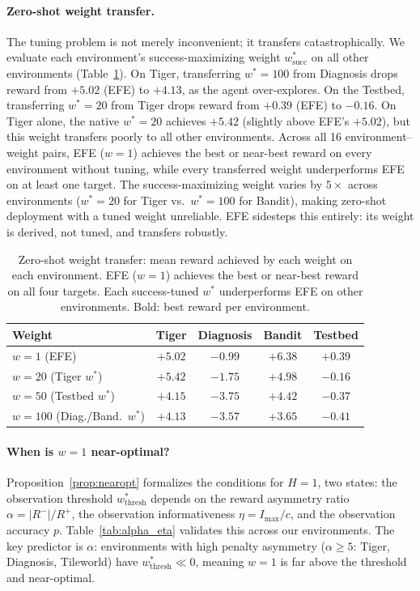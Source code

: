 \documentclass{article}
\begin{document}
\paragraph{Zero-shot weight transfer.}
The tuning problem is not merely inconvenient; it transfers catastrophically. We evaluate each environment's success-maximizing weight $w^*_{\text{succ}}$ on all other environments (Table~\ref{tab:transfer}). On Tiger, transferring $w^*{=}100$ from Diagnosis drops reward from $+5.02$ (EFE) to $+4.13$, as the agent over-explores. On the Testbed, transferring $w^*{=}20$ from Tiger drops reward from $+0.39$ (EFE) to $-0.16$. On Tiger alone, the native $w^*{=}20$ achieves $+5.42$ (slightly above EFE's $+5.02$), but this weight transfers poorly to all other environments. Across all 16 environment--weight pairs, EFE ($w{=}1$) achieves the best or near-best reward on every environment without tuning, while every transferred weight underperforms EFE on at least one target. The success-maximizing weight varies by $5\times$ across environments ($w^*{=}20$ for Tiger vs.\ $w^*{=}100$ for Bandit), making zero-shot deployment with a tuned weight unreliable. EFE sidesteps this entirely: its weight is derived, not tuned, and transfers robustly.

\begin{table}[ht]
\centering
\caption{Zero-shot weight transfer: mean reward achieved by each weight on each environment. EFE ($w{=}1$) achieves the best or near-best reward on all four targets. Each success-tuned $w^*$ underperforms EFE on other environments. Bold: best reward per environment.}
\label{tab:transfer}
\begin{small}
\begin{tabular}{lcccc}
\toprule
Weight & Tiger & Diagnosis & Bandit & Testbed \\
\midrule
$w{=}1$ (EFE) & $+5.02$ & $\mathbf{-0.99}$ & $\mathbf{+6.38}$ & $\mathbf{+0.39}$ \\
$w{=}20$ (Tiger $w^*$) & $\mathbf{+5.42}$ & $-1.75$ & $+4.98$ & $-0.16$ \\
$w{=}50$ (Testbed $w^*$) & $+4.15$ & $-3.75$ & $+4.42$ & $-0.37$ \\
$w{=}100$ (Diag./Band.\ $w^*$) & $+4.13$ & $-3.57$ & $+3.65$ & $-0.41$ \\
\bottomrule
\end{tabular}
\end{small}
\end{table}

\paragraph{When is $w{=}1$ near-optimal?}
Proposition~\ref{prop:nearopt} formalizes the conditions for $H{=}1$, two states: the observation threshold $w^*_{\text{thresh}}$ depends on the reward asymmetry ratio $\alpha = |R^-|/R^+$, the observation informativeness $\eta = I_{\max}/c$, and the observation accuracy $p$. Table~\ref{tab:alpha_eta} validates this across our environments. The key predictor is $\alpha$: environments with high penalty asymmetry ($\alpha \geq 5$: Tiger, Diagnosis, Tileworld) have $w^*_{\text{thresh}} \ll 0$, meaning $w{=}1$ is far above the threshold and near-optimal.
\end{document}
